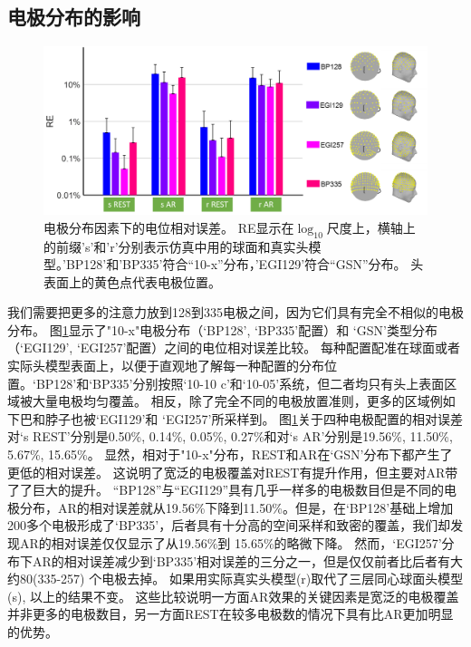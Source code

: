 \subsection{电极分布的影响}
\begin{figure}[h!]
	\centering
	\includegraphics[width=15cm]{pic/JNE/figure5.png}
	\caption{电极分布因素下的电位相对误差。 RE显示在$\log_{10}$尺度上，横轴上的前缀's'和'r'分别表示仿真中用的球面和真实头模型。'BP128'和'BP335'符合“10-x”分布，'EGI129'符合“GSN”分布。 头表面上的黄色点代表电极位置。}
	\label{2.5}
\end{figure}
我们需要把更多的注意力放到128到335电极之间，因为它们具有完全不相似的电极分布。 图\ref{2.5}显示了"10-x"电极分布（‘BP128’, ‘BP335’配置）和 ‘GSN’类型分布（‘EGI129’, ‘EGI257’配置）之间的电位相对误差比较。 每种配置配准在球面或者实际头模型表面上，以便于直观地了解每一种配置的分布位置。‘BP128’和‘BP335’分别按照‘10-10 c’和‘10-05’系统，但二者均只有头上表面区域被大量电极均匀覆盖。 相反，除了完全不同的电极放置准则，更多的区域例如下巴和脖子也被‘EGI129’和
‘EGI257’所采样到。 图\ref{2.5}关于四种电极配置的相对误差对‘s REST’分别是0.50\%, 0.14\%, 0.05\%, 0.27\%和对‘s AR’分别是19.56\%, 11.50\%, 5.67\%, 15.65\%。 显然，相对于"10-x"分布，REST和AR在‘GSN’分布下都产生了更低的相对误差。 这说明了宽泛的电极覆盖对REST有提升作用，但主要对AR带了了巨大的提升。 “BP128”与“EGI129”具有几乎一样多的电极数目但是不同的电极分布，AR的相对误差就从19.56\%下降到11.50\%。但是，在‘BP128’基础上增加200多个电极形成了‘BP335’，后者具有十分高的空间采样和致密的覆盖，我们却发现AR的相对误差仅仅显示了从19.56\%到 
15.65\%的略微下降。 然而，‘EGI257’分布下AR的相对误差减少到‘BP335’相对误差的三分之一，但是仅仅前者比后者有大约80(335-257) 个电极去掉。 如果用实际真实头模型(r)取代了三层同心球面头模型(s), 以上的结果不变。 这些比较说明一方面AR效果的关键因素是宽泛的电极覆盖并非更多的电极数目，另一方面REST在较多电极数的情况下具有比AR更加明显的优势。

